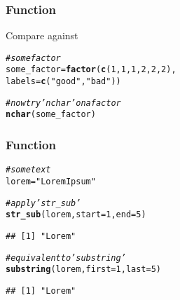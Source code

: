 \documentclass[12pt]{beamer}\usepackage[]{graphicx}\usepackage[]{color}
\makeatletter
\newcommand{\hlnum}[1]{\textcolor[rgb]{0.686,0.059,0.569}{#1}}%
\newcommand{\hlstr}[1]{\textcolor[rgb]{0.192,0.494,0.8}{#1}}%
\newcommand{\hlcom}[1]{\textcolor[rgb]{0.678,0.584,0.686}{\textit{#1}}}%
\newcommand{\hlstd}[1]{\textcolor[rgb]{0.345,0.345,0.345}{#1}}%
\newcommand{\hlkwb}[1]{\textcolor[rgb]{0.69,0.353,0.396}{#1}}%
\newcommand{\hlkwc}[1]{\textcolor[rgb]{0.333,0.667,0.333}{#1}}%
\newcommand{\hlkwd}[1]{\textcolor[rgb]{0.737,0.353,0.396}{\textbf{#1}}}%
\newenvironment{kframe}{%
 \def\at@end@of@kframe{}%
 \ifinner\ifhmode%
  \def\at@end@of@kframe{\end{minipage}}%
  \begin{minipage}{\columnwidth}%
 \fi\fi%
 \def\FrameCommand##1{\hskip\@totalleftmargin \hskip-\fboxsep
 \colorbox{shadecolor}{##1}\hskip-\fboxsep
     \hskip-\linewidth \hskip-\@totalleftmargin \hskip\columnwidth}%
 \MakeFramed {\advance\hsize-\width
   \@totalleftmargin\z@ \linewidth\hsize
   \@setminipage}}%
 {\par\unskip\endMakeFramed%
 \at@end@of@kframe}
\newenvironment{knitrout}{}{} %
\makeatother
\begin{document}

\begin{frame}[fragile]
\frametitle{Function }

Compare  against 
\begin{knitrout}\footnotesize
{}\color{fgcolor}\begin{kframe}
\begin{alltt}
\hlcom{# some factor}
\hlstd{some_factor} \hlkwb{=} \hlkwd{factor}\hlstd{(}\hlkwd{c}\hlstd{(}\hlnum{1}\hlstd{,}\hlnum{1}\hlstd{,}\hlnum{1}\hlstd{,}\hlnum{2}\hlstd{,}\hlnum{2}\hlstd{,}\hlnum{2}\hlstd{),}
                     \hlkwc{labels} \hlstd{=} \hlkwd{c}\hlstd{(}\hlstr{"good"}\hlstd{,} \hlstr{"bad"}\hlstd{))}

\hlcom{# now try 'nchar' on a factor}
\hlkwd{nchar}\hlstd{(some_factor)}
\end{alltt}


{\ttfamily\noindent\bfseries\color{errorcolor}{\#\# Error in nchar(some\_factor): 'nchar()' requires a character vector}}\end{kframe}
\end{knitrout}

\end{frame}


\begin{frame}[fragile]
\frametitle{Function }

\begin{knitrout}\footnotesize
{}\color{fgcolor}\begin{kframe}
\begin{alltt}
\hlcom{# some text}
\hlstd{lorem} \hlkwb{=} \hlstr{"Lorem Ipsum"}

\hlcom{# apply 'str_sub'}
\hlkwd{str_sub}\hlstd{(lorem,} \hlkwc{start}\hlstd{=}\hlnum{1}\hlstd{,} \hlkwc{end}\hlstd{=}\hlnum{5}\hlstd{)}
\end{alltt}
\begin{verbatim}
## [1] "Lorem"
\end{verbatim}
\begin{alltt}
\hlcom{# equivalent to 'substring'}
\hlkwd{substring}\hlstd{(lorem,} \hlkwc{first}\hlstd{=}\hlnum{1}\hlstd{,} \hlkwc{last}\hlstd{=}\hlnum{5}\hlstd{)}
\end{alltt}
\begin{verbatim}
## [1] "Lorem"
\end{verbatim}
\end{kframe}
\end{knitrout}

\end{frame}
\end{document}

